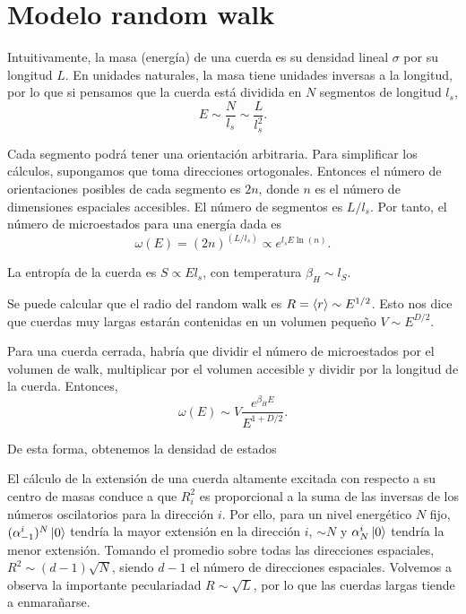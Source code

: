\section{Modelo random walk}

Intuitivamente, la masa (energía) de una cuerda es su densidad lineal $\sigma$ por su longitud $L$.
En unidades naturales, la masa tiene unidades inversas a la longitud, por lo que si pensamos
que la cuerda está dividida en $N$ segmentos de longitud $l_s$, 
\begin{equation}
  E\sim  \frac{N}{l_s} \sim \frac{L}{l_s^2}.
\end{equation}

Cada segmento podrá tener una orientación arbitraria. Para simplificar los cálculos,
supongamos que toma direcciones ortogonales. Entonces el número de orientaciones posibles
de cada segmento es $2n$, donde $n$ es el número de dimensiones espaciales accesibles.
El número de segmentos es $L/l_s$.
Por tanto, el número de microestados para una energía dada es
\begin{equation}
  \omega(E)=(2n)^{(L/l_s)}\propto e^{l_s E \ln (n)}.
\end{equation}

La entropía de la cuerda es $S\propto El_s$, con temperatura $\beta_H\sim l_S$.

Se puede calcular que el radio del random walk es $R=\expval{r}\sim E^{1/2}$. Esto
nos dice que cuerdas muy largas estarán contenidas en un volumen pequeño $V\sim E^{D/2}$.

Para una cuerda cerrada, habría que dividir el número de microestados por el 
volumen de walk, multiplicar por el volumen accesible y dividir por la longitud de la cuerda.
Entonces,
\begin{equation}
  \omega(E)\sim V \frac{e^{\beta_H E}}{E^{1+D/2}}.
\end{equation}

De esta forma, obtenemos la densidad de estados 

El cálculo de la extensión de una cuerda altamente excitada con respecto a su centro de masas 
conduce a que $R^2_i$ es proporcional a la suma de las inversas de los números oscilatorios para
la dirección $i$.
Por ello, para un nivel energético $N$ fijo, $(\alpha^i_{-1})^N\ket{0}$ tendría la mayor extensión en la dirección $i$, $\sim N$ y
$\alpha^i_N\ket{0}$ tendría la menor extensión.
Tomando el promedio sobre todas las direcciones espaciales, $R^2\sim (d-1)\sqrt{N}$, siendo
$d-1$ el número de direcciones espaciales. Volvemos a  observa la importante peculariadad $R\sim \sqrt{L}$,
por lo que las cuerdas largas tiende a enmarañarse.

